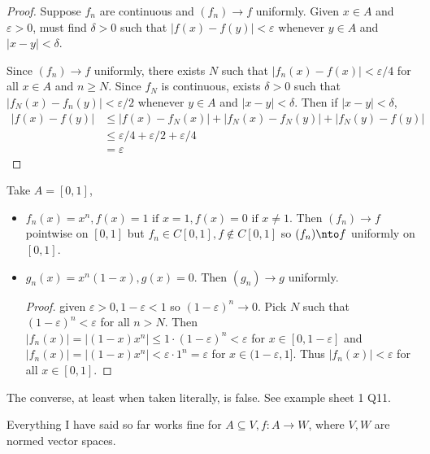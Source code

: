 \documentclass[a4paper]{article}
\theoremstyle{definition}
\begin{document}
\begin{proof}
  Suppose \(f_n\) are continuous and \((f_n)\to f\) uniformly. Given \(x\in A\) and \(\varepsilon>0\), must find \(\delta>0\) such that \(|f(x)-f(y)| < \varepsilon\) whenever \(y\in A\) and \(|x-y|<\delta\).

  Since \((f_n)\to f\) uniformly, there exists \(N\) such that \(|f_n(x)-f(x)|< \varepsilon/4\) for all \(x\in A\) and \(n\geq N\). Since \(f_N\) is continuous, exists \(\delta>0\) such that \(|f_N(x)-f_n(y)|<\varepsilon/2\) whenever \(y\in A\) and \(|x-y|<\delta\). Then if \(|x-y| < \delta\),
  \begin{align*}
    |f(x)-f(y)| &\leq |f(x)-f_N(x)| + |f_N(x)-f_N(y)| + |f_N(y)-f(y)| \\
                &\leq \varepsilon/4 + \varepsilon/2 + \varepsilon/4 \\
                &= \varepsilon
  \end{align*}
\end{proof}

\begin{eg}
  Take \(A=[0,1]\),
  \begin{itemize}
  \item \(f_n(x)=x^n, f(x) = 1\text{ if } x=1, f(x)=0 \text{ if } x\neq 1\). Then \((f_n)\to f\) pointwise on \([0,1]\) but \(f_n\in C[0,1], f\notin C[0,1]\) so \((f_n)\nto f\) uniformly on \([0,1]\).
  \item \(g_n(x) = x^n(1-x), g(x) =0\). Then \((g_n)\to g\) uniformly.
\begin{proof}
  given \(\varepsilon>0, 1-\varepsilon<1\) so \((1-\varepsilon)^n\to 0\). Pick \(N\) such that \((1-\varepsilon)^n < \varepsilon\) for all \(n> N\). Then \(|f_n(x)| = |(1-x)x^n| \leq 1\cdot(1-\varepsilon)^n < \varepsilon\) for \(x\in[0,1-\varepsilon]\) and \(|f_n(x)| = |(1-x)x^n| < \varepsilon\cdot1^n=\varepsilon\) for \(x\in (1-\varepsilon,1]\). Thus \(|f_n(x)| < \varepsilon\) for all \(x\in[0,1]\).
\end{proof}
  \end{itemize}
\end{eg}

\begin{note}
  The converse, at least when taken literally, is false. See example sheet 1 Q11.
\end{note}

\begin{remark}
  Everything I have said so far works fine for \(A\subseteq V, f: A\to W\), where \(V, W\) are normed vector spaces.
\end{remark}
\end{document}
